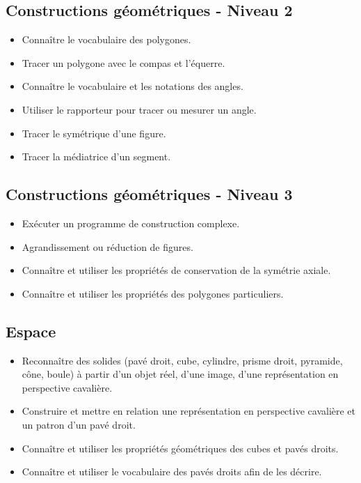 \documentclass[a4paper,12pt,fleqn]{article}
\begin{document}
\subsection*{Constructions géométriques - Niveau 2}

\begin{itemize}[itemsep=1em]
	\item {}Connaître le vocabulaire des polygones.
	\item {}Tracer un polygone avec le compas et l’équerre.
	\item {}Connaître le vocabulaire et les notations des angles.
	\item {}Utiliser le rapporteur pour tracer ou mesurer un angle.
	\item {}Tracer le symétrique d’une figure.
	\item {}Tracer la médiatrice d’un segment.
\end{itemize}

\subsection*{Constructions géométriques - Niveau 3}

\begin{itemize}[itemsep=1em]
	\item {}Exécuter un programme de construction complexe.
	\item {}Agrandissement ou réduction de figures.
	\item {}Connaître et utiliser les propriétés de conservation de la symétrie axiale.
	\item {}Connaître et utiliser les propriétés des polygones particuliers.
\end{itemize}

\subsection*{Espace}

\begin{itemize}[itemsep=1em]
	\item {}Reconnaître des solides (pavé droit, cube, cylindre, prisme droit, pyramide, cône, boule) à partir d’un objet réel, d’une image, d’une représentation en perspective cavalière.
	\item {}Construire et mettre en relation une représentation en perspective cavalière et un patron d’un pavé droit.
    \item {}Connaître et utiliser les propriétés géométriques des cubes et pavés droits.
    \item {}Connaître et utiliser le vocabulaire des pavés droits afin de les décrire.

\end{itemize}
\end{document}
